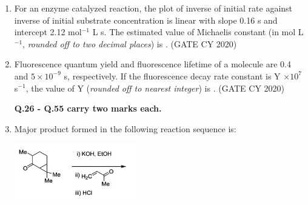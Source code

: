 \documentclass[12pt]{article}
\begin{document}
\begin{enumerate}
\item For an enzyme catalyzed reaction, the plot of inverse of initial rate against inverse of initial substrate concentration is linear with slope 0.16 s and intercept 2.12 mol$^{-1}$ L s. The estimated value of Michaelis constant (in mol L$^{-1}$, \textit{rounded off to two decimal places}) is \underline{\hspace{2cm}}.
\hfill (GATE CY 2020)

\item Fluorescence quantum yield and fluorescence lifetime of a molecule are 0.4 and $5 \times 10^{-9}$ s, respectively. If the fluorescence decay rate constant is Y $\times 10^7$ s$^{-1}$, the value of Y (\textit{rounded off to nearest integer}) is \underline{\hspace{2cm}}.
\hfill (GATE CY 2020)


\textbf{Q.26 - Q.55 carry two marks each.}

\item Major product formed in the following reaction sequence is:

\begin{center}
\includegraphics[width=0.6\columnwidth]{figs/q26.png}
 \label{fig:q26}
\end{center}


\end{enumerate}
\end{document}
